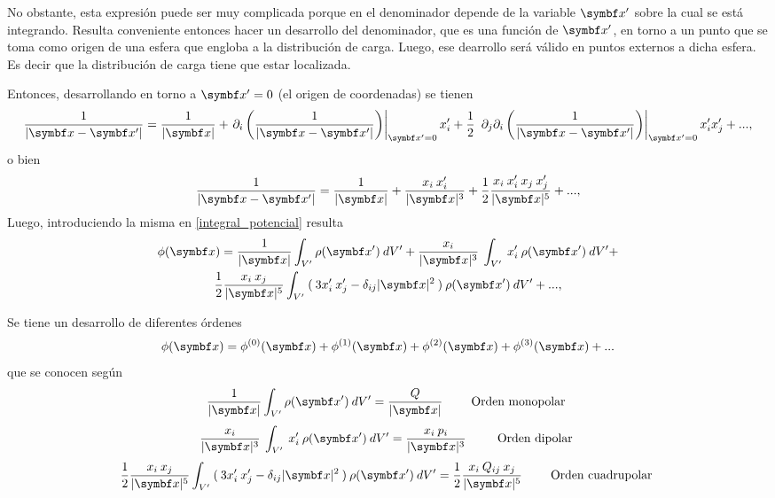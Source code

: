 \documentclass[10pt,oneside]{CBFT_book}
\begin{document}
No obstante, esta expresión puede ser muy complicada porque en el denominador depende de la variable 
$\vbx'$ sobre la cual se está integrando. 
Resulta conveniente entonces hacer un desarrollo del denominador, que es una función de $\vbx'$, en
torno a un punto que se toma como origen de una esfera que engloba a la distribución de carga.
Luego, ese dearrollo será válido en puntos externos a dicha esfera. Es decir que la distribución
de carga tiene que estar localizada.


Entonces, desarrollando en torno a $\vbx'=0$ (el origen de coordenadas) se tienen
\[
	\frac{ 1 }{| \vbx -\vbx' | } = 
	\frac{ 1 }{| \vbx |} + \left.\partial_i \left( \frac{ 1 }{| \vbx -\vbx' | } \right)\right|_{\vbx'=0} x_i' +
	\frac{1}{2} \: \left. \partial_j \partial_i \left( \frac{ 1 }{| \vbx -\vbx' | } \right)\right|_{\vbx'=0} x_i' x_j' + ...,
\]
o bien 
\[
	\frac{ 1 }{| \vbx -\vbx' | } = 
	\frac{ 1 }{| \vbx |} + \frac{x_i \: x_i'}{| \vbx |^3} +
	\frac{1}{2} \frac{ x_i \: x_i' \: x_j \: x_j' }{ | \vbx |^5 } + ...,	
\]
Luego, introduciendo la misma en \eqref{integral_potencial} resulta
\begin{multline*}
 	\phi(\vb{x}) =
	\frac{ 1 }{| \vbx |} \int_{V'} \rho( \vbx' ) \: dV' + 
	\frac{x_i }{| \vbx |^3} \: \int_{V'} \: x_i' \: \rho( \vbx' ) \: dV' + \\
	\frac{1}{2} \frac{ x_i  \: x_j  }{ | \vbx |^5 } 
	\int_{V'} \: (\: 3 x_i' \: x_j' - \delta_{ij}|\vbx|^2 \:) \: \rho( \vbx' ) \: dV' + ...,
\end{multline*}

Se tiene un desarrollo de diferentes órdenes 
\[
	\phi(\vb{x}) = \phi^{(0)}(\vbx) + \phi^{(1)}(\vbx) + \phi^{(2)}(\vbx) + \phi^{(3)}(\vbx) + ...
\]
que se conocen según
\[
	\frac{ 1 }{| \vbx |} \int_{V'} \rho( \vbx' ) \: dV' = \frac{ Q }{| \vbx |} \qquad \text{ Orden monopolar }
\]
\[
	\frac{x_i }{| \vbx |^3} \: \int_{V'} \: x_i' \: \rho( \vbx' ) \: dV' = 
	\frac{x_i \: p_i }{| \vbx |^3} \: \qquad \text{ Orden dipolar }
\]
\[
	\frac{1}{2} \frac{ x_i  \: x_j  }{ | \vbx |^5 } 
	\int_{V'} \: (\: 3 x_i' \: x_j' - \delta_{ij}|\vbx|^2 \:) \: \rho( \vbx' ) \: dV' =
	\frac{1}{2} \frac{ x_i  \: Q_{ij} \: x_j  }{ | \vbx |^5 } \qquad \text{ Orden cuadrupolar }
\]
\end{document}
